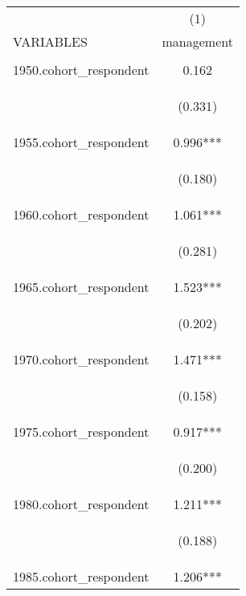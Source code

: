 \begin{center}
\begin{tabular}{lc} \hline
 & (1) \\
VARIABLES & management \\ \hline
\vspace{4pt} & \begin{footnotesize}\end{footnotesize} \\
1950.cohort\_respondent & 0.162 \\
\vspace{4pt} & \begin{footnotesize}(0.331)\end{footnotesize} \\
1955.cohort\_respondent & 0.996*** \\
\vspace{4pt} & \begin{footnotesize}(0.180)\end{footnotesize} \\
1960.cohort\_respondent & 1.061*** \\
\vspace{4pt} & \begin{footnotesize}(0.281)\end{footnotesize} \\
1965.cohort\_respondent & 1.523*** \\
\vspace{4pt} & \begin{footnotesize}(0.202)\end{footnotesize} \\
1970.cohort\_respondent & 1.471*** \\
\vspace{4pt} & \begin{footnotesize}(0.158)\end{footnotesize} \\
1975.cohort\_respondent & 0.917*** \\
\vspace{4pt} & \begin{footnotesize}(0.200)\end{footnotesize} \\
1980.cohort\_respondent & 1.211*** \\
\vspace{4pt} & \begin{footnotesize}(0.188)\end{footnotesize} \\
1985.cohort\_respondent & 1.206*** \\

\end{tabular}
\end{center}
